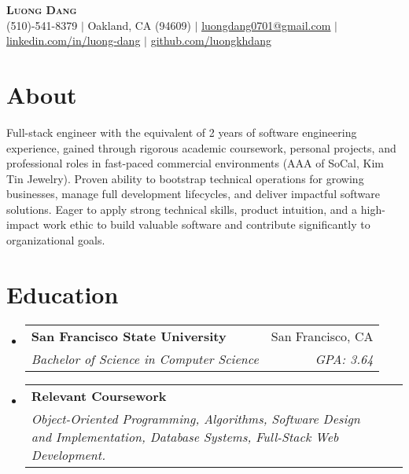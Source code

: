 \documentclass[letterpaper,10pt]{article}
\makeatletter
\newcommand{\resumeSubheading}[4]{
  \vspace{-2pt}\item %
  \begin{tabular*}{0.97\textwidth}[t]{l@{\extracolsep{\fill}}r}
    \textbf{#1} & #2 \\
    \textit{\small#3} & \textit{\small #4} \\
  \end{tabular*}\vspace{-6pt} %
}
\newcommand{\resumeSubHeadingListStart}{\begin{itemize}[leftmargin=0.15in, label={}]}
\newcommand{\resumeSubHeadingListEnd}{\end{itemize}}
\makeatother
\begin{document}
\begin{center}
    \textbf{\Huge \scshape Luong Dang} \\ \vspace{1pt} %
    \small %
    (510)-541-8379 $|$
    \small %
    Oakland, CA (94609) $|$
    \href{mailto:luongdang0701@gmail.com}{\underline{luongdang0701@gmail.com}} $|$
    \href{https://linkedin.com/in/luong-dang}{\underline{linkedin.com/in/luong-dang}} $|$
    \href{https://github.com/luongkhdang}{\underline{github.com/luongkhdang}}
\end{center}

\section{About} 
\small{\justifying %
Full-stack engineer with the equivalent of 2 years of software engineering experience, gained through rigorous academic coursework, personal projects, and professional roles in fast-paced commercial environments (AAA of SoCal, Kim Tin Jewelry). Proven ability to bootstrap technical operations for growing businesses, manage full development lifecycles, and deliver impactful software solutions. Eager to apply strong technical skills, product intuition, and a high-impact work ethic to build valuable software and contribute significantly to organizational goals.
} %

\section{Education}
\resumeSubHeadingListStart
    \resumeSubheading
      {San Francisco State University}{San Francisco, CA}
      {Bachelor of Science in Computer Science}{GPA: 3.64} %
    \vspace{3pt} %
    \resumeSubheading %
      {Relevant Coursework}{} %
      {Object-Oriented Programming, Algorithms, Software Design and Implementation, Database Systems, Full-Stack Web Development.}{} %
\resumeSubHeadingListEnd
\end{document}
